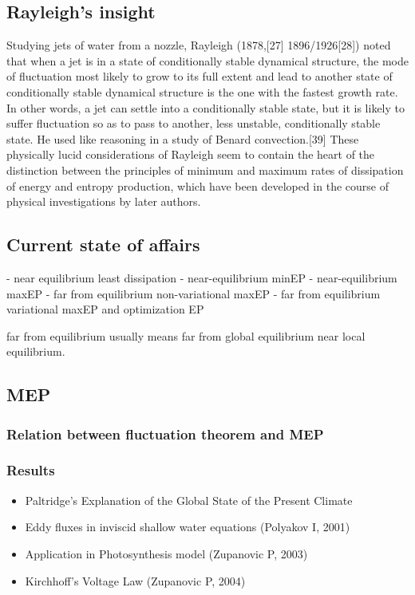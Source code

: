 \documentclass[a4paper,12pt,nofootinbib]{article}
\begin{document}
\subsection{Rayleigh's insight}
Studying jets of water from a nozzle, Rayleigh (1878,[27] 1896/1926[28]) noted that when a jet is in a state of conditionally stable dynamical structure, the mode of fluctuation most likely to grow to its full extent and lead to another state of conditionally stable dynamical structure is the one with the fastest growth rate. In other words, a jet can settle into a conditionally stable state, but it is likely to suffer fluctuation so as to pass to another, less unstable, conditionally stable state. He used like reasoning in a study of Benard convection.[39] These physically lucid considerations of Rayleigh seem to contain the heart of the distinction between the principles of minimum and maximum rates of dissipation of energy and entropy production, which have been developed in the course of physical investigations by later authors.

\subsection{Current state of affairs}

- near equilibrium least dissipation
- near-equilibrium minEP
- near-equilibrium maxEP
- far from equilibrium non-variational maxEP
- far from equilibrium variational maxEP and optimization EP

far from equilibrium usually means far from global equilibrium near local equilibrium.

\subsection{MEP}
\subsubsection{Relation between fluctuation theorem and MEP}
\subsubsection{Results}
\begin{itemize}
	\item Paltridge's Explanation of the Global State of the Present Climate
	\item Eddy fluxes in inviscid shallow water equations (Polyakov I, 2001)
	\item Application in Photosynthesis model (Zupanovic P, 2003)
	\item Kirchhoff's Voltage Law (Zupanovic P, 2004)
\end{itemize}
\end{document}
